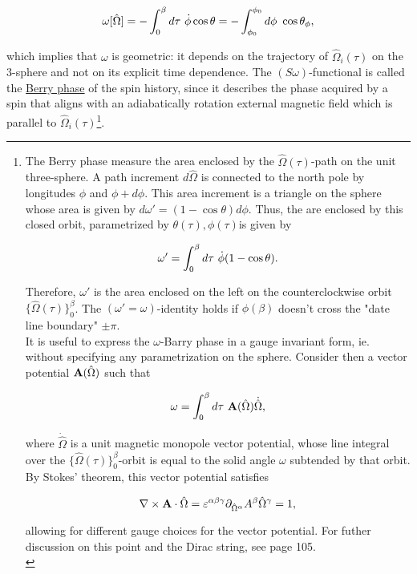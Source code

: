 \begin{equation}
    \omega[\hat{\Omega}] = -\int_{0}^\beta d\tau \textnormal{ } \dot{\phi} \cos \theta = - \int_{\phi_0}^{\phi_0} d\phi \textnormal{ } \cos \theta_\phi,
    \label{spin_wave_theoretic_wave_barry_phase}
\end{equation}

which implies that $\omega$ is geometric: it depends on the trajectory of $\hat{\Omega}_i(\tau)$ on the 3-sphere and not on its explicit time dependence. The $(S\omega)$-functional is called the \underline{Berry phase} of the spin history, since it describes the phase acquired by a spin that aligns with an adiabatically rotation external magnetic field which is parallel to $\hat{\Omega}_i(\tau)$\footnote{

The Berry phase measure the area enclosed by the $\hat{\Omega}(\tau)$-path on the unit three-sphere. A path increment $d\hat{\Omega}$ is connected to the north pole by longitudes $\phi$ and $\phi + d\phi$. This area increment is a triangle on the sphere whose area is given by $d\omega' = (1-\cos \theta) d\phi$. Thus, the are enclosed by this closed orbit, parametrized by $\theta(\tau), \phi(\tau)$is given by 

$$
    \omega' = \int_0^\beta d\tau \textnormal{ } \dot{\phi}(1-\cos \theta).
$$

Therefore, $\omega'$ is the area enclosed on the left on the counterclockwise orbit $\{\hat{\Omega}(\tau)\}_0^\beta$. The $(\omega' = \omega)$-identity holds if $\phi(\beta)$ doesn't cross the "date line boundary" $\pm \pi$. \\

It is useful to express the $\omega$-Barry phase in a gauge invariant form, ie. without specifying any parametrization on the sphere. Consider then a vector potential ${\bf A}(\hat{\Omega})$ such that 

$$
    \omega = \int_{0}^{\beta} d\tau \textnormal{ } {\bf A}(\hat{\Omega}) \dot{\hat{\Omega}},
$$

where $\dot{\hat{\Omega}}$ is a unit magnetic monopole vector potential, whose line integral over the $\{\hat{\Omega}(\tau)\}_0^\beta$-orbit is equal to the solid angle $\omega$ subtended by that orbit. By Stokes' theorem, this vector potential satisfies 

\begin{equation}
    \nabla \times {\bf A} \cdot \hat{\Omega} = \varepsilon^{\alpha\beta\gamma} \partial_{{\hat{\Omega}^\alpha}} A^\beta \hat{\Omega}^\gamma = 1,
\end{equation}

allowing for different gauge choices for the vector potential. For futher discussion on this point and the Dirac string, see \cite{assa} page 105. \\

}. \bigbreak

